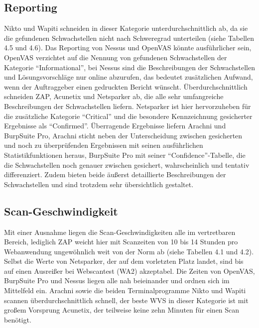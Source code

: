 \documentclass[12pt,oneside,a4paper,parskip,pointlessnumbers]{scrbook}
\begin{document}
  \subsection{Reporting}
  Nikto und Wapiti schneiden in dieser Kategorie unterdurchschnittlich ab, da sie die gefundenen Schwachstellen nicht nach Schweregrad unterteilen (siehe Tabellen 4.5 und 4.6). Das Reporting von Nessus und OpenVAS könnte ausführlicher sein, OpenVAS verzichtet auf die Nennung von gefundenen Schwachstellen der Kategorie ``Informational'', bei Nessus sind die Beschreibungen der Schwachstellen und Lösungsvorschläge nur online abzurufen, das bedeutet zusätzlichen Aufwand, wenn der Auftraggeber einen gedruckten Bericht wünscht.
  Überdurchschnittlich schneiden ZAP, Acunetix und Netsparker ab, die alle sehr umfangreiche Beschreibungen der Schwachstellen liefern. Netsparker ist hier hervorzuheben für die zusätzliche Kategorie ``Critical'' und die besondere Kennzeichnung gesicherter Ergebnisse als ``Confirmed''.
  Überragende Ergebnisse liefern Arachni und BurpSuite Pro, Arachni sticht neben der Unterscheidung zwischen gesicherten und noch zu überprüfenden Ergebnissen mit seinen ausführlichen Statistikfunktionen heraus, BurpSuite Pro mit seiner ``Confidence''-Tabelle, die die Schwachstellen noch genauer zwischen gesichert, wahrscheinlich und tentativ differenziert. Zudem bieten beide äußerst detaillierte Beschreibungen der Schwachstellen und sind trotzdem sehr übersichtlich gestaltet.
  \subsection{Scan-Geschwindigkeit}
  Mit einer Ausnahme liegen die Scan-Geschwindigkeiten alle im vertretbaren Bereich, lediglich ZAP weicht hier mit Scanzeiten von 10 bis 14 Stunden pro Webanwendung ungewöhnlich weit von der Norm ab (siehe Tabellen 4.1 und 4.2). Selbst die Werte von Netsparker, der auf dem vorletzten Platz landet, sind bis auf einen Ausreißer bei Webscantest (WA2) akzeptabel. Die Zeiten von OpenVAS, BurpSuite Pro und Nessus liegen alle nah beieinander und ordnen sich im Mittelfeld ein. Arachni sowie die beiden Terminalprogramme Nikto und Wapiti scannen überdurchschnittlich schnell, der beste WVS in dieser Kategorie ist mit großem Vorsprung Acunetix, der teilweise keine zehn Minuten für einen Scan benötigt.
\end{document}
